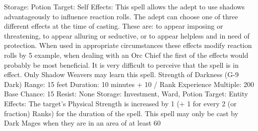 \documentclass[a4paper]{article}
\begin{document}
\begin{multicols}{3}
Storage: Potion
Target: Self
Effects: This spell allows the adept to use shadows
advantageously to influence reaction rolls. The
adept can choose one of three different effects at
the time of casting. These are: to appear imposing
or threatening, to appear alluring or seductive, or to
appear helpless and in need of protection. When
used in appropriate circumstances these effects
modify reaction rolls by 5%
example, when dealing with an Orc Chief the first
of the effects would probably be most beneficial. It
is very difficult to perceive that the spell is in effect. Only Shadow Weavers may learn this spell.
Strength of Darkness (G-9 Dark)
Range: 15 feet
Duration: 10 minutes + 10 / Rank
Experience Multiple: 200
Base Chance: 15%
Resist: None
Storage: Investment, Ward, Potion
Target: Entity
Effects: The target’s Physical Strength is increased
by 1 (+ 1 for every 2 (or fraction) Ranks) for the
duration of the spell. This spell may only be cast
by Dark Mages when they are in an area of at least
60%


\end{multicols}
\end{document}
